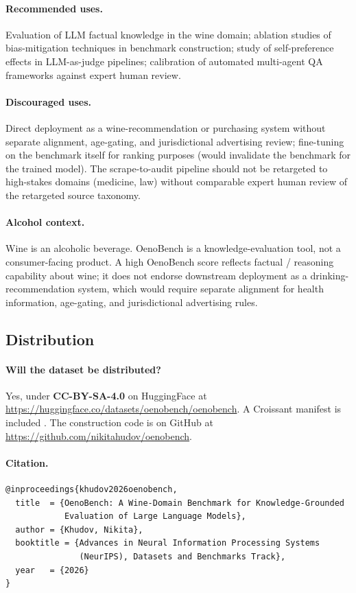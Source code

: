 \paragraph{Recommended uses.} Evaluation of LLM factual knowledge in
the wine domain; ablation studies of bias-mitigation techniques in
benchmark construction; study of self-preference effects in
LLM-as-judge pipelines; calibration of automated multi-agent QA
frameworks against expert human review.

\paragraph{Discouraged uses.} Direct deployment as a wine-recommendation
or purchasing system without separate alignment, age-gating, and
jurisdictional advertising review; fine-tuning on the benchmark itself
for ranking purposes (would invalidate the benchmark for the trained
model). The scrape-to-audit pipeline should not be retargeted to
high-stakes domains (medicine, law) without comparable expert human
review of the retargeted source taxonomy.

\paragraph{Alcohol context.} Wine is an alcoholic beverage. OenoBench
is a knowledge-evaluation tool, not a consumer-facing product. A
high OenoBench score reflects factual / reasoning capability about
wine; it does not endorse downstream deployment as a
drinking-recommendation system, which would require separate
alignment for health information, age-gating, and jurisdictional
advertising rules.

\subsection{Distribution}
\paragraph{Will the dataset be distributed?}
Yes, under \textbf{CC-BY-SA-4.0} on HuggingFace at
\url{https://huggingface.co/datasets/oenobench/oenobench}. A Croissant
manifest is included \citep{koehn2024croissant}. The construction
code is on GitHub at \url{https://github.com/nikitahudov/oenobench}.

\paragraph{Citation.}
\begin{verbatim}
@inproceedings{khudov2026oenobench,
  title  = {OenoBench: A Wine-Domain Benchmark for Knowledge-Grounded
            Evaluation of Large Language Models},
  author = {Khudov, Nikita},
  booktitle = {Advances in Neural Information Processing Systems
               (NeurIPS), Datasets and Benchmarks Track},
  year   = {2026}
}
\end{verbatim}

